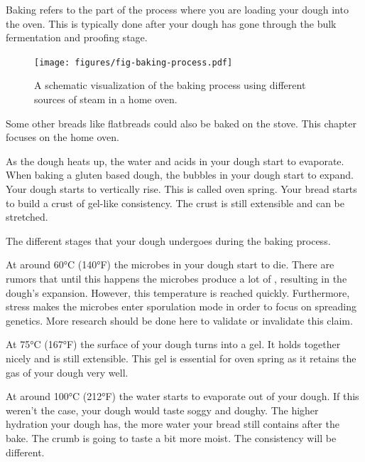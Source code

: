 Baking refers to the part of the process where you are loading
your dough into the oven. This is typically done after your
dough has gone through the bulk fermentation and proofing stage.

\begin{figure}[!htb]
  \texttt{[image: figures/fig-baking-process.pdf]}
  \caption{A schematic visualization of the baking process using different sources of steam in a home oven.}
  \label{fig:baking-process}
\end{figure}

Some other breads like flatbreads
could also be baked on the stove. This chapter focuses on the
home oven.

As the dough heats up, the water and acids
in your dough start to evaporate. When baking
a gluten based dough, the bubbles in your dough start to expand.
Your dough starts to vertically rise. This is called oven spring.
Your bread starts to build a crust of gel-like consistency. The crust is still
extensible and can be stretched.

\begin{table}[htp!]
    \begin{center}
        
        \caption{The different stages that your dough undergoes during the baking process.}
    \end{center}
\end{table}

At around 60°C (140°F) the microbes in your dough start to die.
There are rumors that until this happens the microbes produce
a lot of , resulting in the dough's expansion. However, this temperature
is reached quickly. Furthermore, stress makes the microbes
enter sporulation mode in order to focus on spreading genetics.
More research should be done here to validate or invalidate this
claim.

At 75°C (167°F) the surface of your dough turns into a gel. It
holds together nicely and is still extensible. This gel is essential
for oven spring as it retains the gas of your dough very well.

At around 100°C (212°F) the water starts to evaporate out of your
dough. If this weren't the case, your dough would taste soggy and
doughy. The higher hydration your dough has, the more water your bread
still contains after the bake. The crumb is going to taste a bit
more moist. The consistency will be different.

